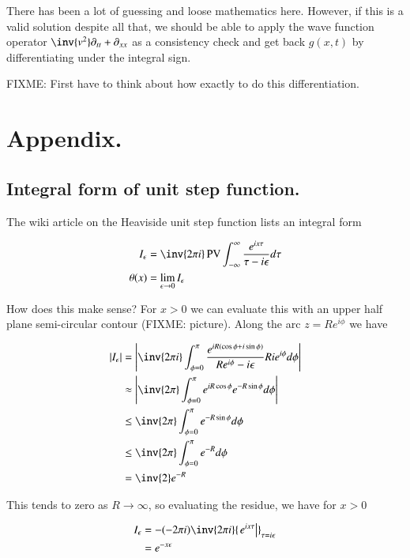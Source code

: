 There has been a lot of guessing and loose mathematics here.  However, if this is a valid solution despite all that, we should be
able to apply the wave function operator $\inv{v^2} \partial_{tt} + \partial_{xx}$ as a 
consistency check and get back $g(x,t)$ by differentiating
under the integral sign.

FIXME: First have to think about how exactly to do this differentiation.

\section{Appendix. }
\subsection{Integral form of unit step function. }

The wiki article on the Heaviside unit step function lists an integral form

\begin{align}
I_\epsilon &= \inv{2\pi i} \PV \IIinf \frac{e^{ix\tau}}{\tau - i\epsilon} d\tau \\
\theta(x) &= \lim_{\epsilon \rightarrow 0} I_\epsilon
\end{align}

How does this make sense?  For $x>0$ we can evaluate this with an upper half plane semi-circular contour (FIXME: picture).  Along the arc $z = R e^{i\phi}$ we have

\begin{align*}
\Abs{I_\epsilon}
&= \Abs{\inv{2\pi i} \int_{\phi=0}^{\pi} \frac{e^{i R (\cos\phi + i \sin\phi)}}{ R e^{i\phi} - i \epsilon} R i e^{i\phi} d\phi} \\
&\approx \Abs{\inv{2\pi} \int_{\phi=0}^{\pi} e^{i R \cos\phi } e^{- R \sin\phi } d\phi} \\
&\le \inv{2\pi} \int_{\phi=0}^{\pi} e^{- R \sin\phi } d\phi \\
&\le \inv{2\pi} \int_{\phi=0}^{\pi} e^{- R } d\phi \\
&= \inv{2} e^{- R } \\
\end{align*}

This tends to zero as $R \rightarrow \infty$, so evaluating the residue, we have for $x > 0$

\begin{align*}
{I_\epsilon}
&= -(-2 \pi i) \inv{2\pi i} {\left. {e^{ix\tau}} \right\vert}_{\tau = i\epsilon} \\
&= e^{-x\epsilon}
\end{align*}

